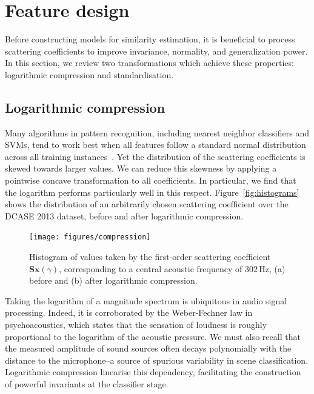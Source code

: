 \documentclass[smallextended]{svjour3}
\begin{document}
\section{Feature design}
\label{sec:design}

Before constructing models for similarity estimation, it is beneficial to process scattering coefficients to improve invariance, normality, and generalization power.
In this section, we review two transformations which achieve these properties: logarithmic compression and standardisation.

\subsection{Logarithmic compression}
\label{sec:logcomp}

Many algorithms in pattern recognition, including nearest neighbor classifiers and SVMs, tend to work best when all features follow a standard normal distribution across all training instances~\cite{Hsu2003}.
Yet the distribution of the scattering coefficients is skewed towards larger values. We can reduce this skewness by applying a pointwise concave transformation to all coefficients. In particular, we find that the logarithm performs particularly well in this respect.
Figure~\ref{fig:histograms} shows the distribution of an arbitrarily chosen scattering coefficient over the DCASE 2013 dataset, before and after logarithmic compression.

\begin{figure}
\begin{center}
\texttt{[image: figures/compression]}
\caption{
\label{fig:histograms}
Histogram of values taken by the first-order scattering coefficient $\mathbf{S}\boldsymbol{x}(\gamma)$, corresponding to a central acoustic frequency of $302\,\mathrm{Hz}$,
(a) before and (b) after logarithmic compression.}
\label{fig:compression}
\end{center}
\end{figure}

Taking the logarithm of a magnitude spectrum is ubiquitous in audio signal processing.
Indeed, it is corroborated by the Weber-Fechner law in psychoacoustics, which states that the sensation of loudness is roughly proportional to the logarithm of the acoustic pressure.
We must also recall that the measured amplitude of sound sources often decays polynomially with the distance to the microphone--a source of spurious variability in scene classification.
Logarithmic compression linearise this dependency, facilitating the construction of powerful invariants at the classifier stage.
\end{document}
